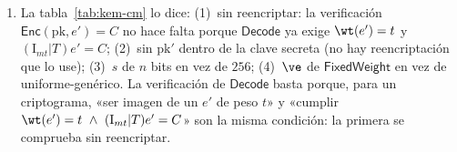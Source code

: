 \begin{enumerate}[leftmargin=1.9em,itemsep=4pt]
        (b)~Con ventaja $<2^{-128}$:
        $\varepsilon_{\mathrm{OW}}<2^{-258}$. Es decir: el teorema
        convierte el objetivo CCA de $128$ bits en un requisito
        OW-CPA de $\approx2^{-258}$: los parámetros deben tener
        margen doble, no nulo (es la raíz cuadrada del QROM, que el
        modelo de costes realista suaviza pero no elimina).
  \item La tabla~\ref{tab:kem-cm} lo dice: (1)~sin reencriptar: la
        verificación $\textsf{Enc}(\mathrm{pk},e')=C$ no hace
        falta porque $\textsf{Decode}$ ya exige $\wt(e')=t$ y
        $(\mathrm{I}_{mt}|T)e'=C$; (2)~sin $\mathrm{pk}'$ dentro de
        la clave secreta (no hay reencriptación que lo use);
        (3)~$s$ de $n$ bits en vez de $256$; (4)~$\ve$ de
        $\textsf{FixedWeight}$ en vez de uniforme-genérico. La
        verificación de $\textsf{Decode}$ basta porque, para un
        criptograma, «ser imagen de un $e'$ de peso $t$» y «cumplir
        $\wt(e')=t\ \wedge\ (\mathrm{I}_{mt}|T)e'=C$» son la misma
        condición: la primera se comprueba sin reencriptar.
\end{enumerate}
